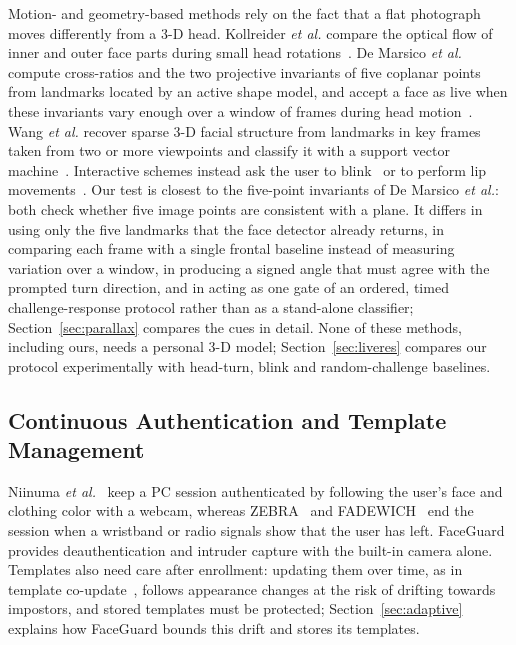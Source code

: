 \documentclass{ieeeaccess}
\begin{document}
Motion- and geometry-based methods rely on the fact that a flat photograph moves differently from a 3-D head. Kollreider \emph{et al.} compare the optical flow of inner and outer face parts during small head rotations~\cite{kollreider2007motion}. De Marsico \emph{et al.} compute cross-ratios and the two projective invariants of five coplanar points from landmarks located by an active shape model, and accept a face as live when these invariants vary enough over a window of frames during head motion~\cite{demarsico2012projective}. Wang \emph{et al.} recover sparse 3-D facial structure from landmarks in key frames taken from two or more viewpoints and classify it with a support vector machine~\cite{wang2013structure}. Interactive schemes instead ask the user to blink~\cite{pan2007eyeblink} or to perform lip movements~\cite{zhou2024lipmotion}. Our test is closest to the five-point invariants of De Marsico \emph{et al.}: both check whether five image points are consistent with a plane. It differs in using only the five landmarks that the face detector already returns, in comparing each frame with a single frontal baseline instead of measuring variation over a window, in producing a signed angle that must agree with the prompted turn direction, and in acting as one gate of an ordered, timed challenge-response protocol rather than as a stand-alone classifier; Section~\ref{sec:parallax} compares the cues in detail. None of these methods, including ours, needs a personal 3-D model; Section~\ref{sec:liveres} compares our protocol experimentally with head-turn, blink and random-challenge baselines.

\subsection{Continuous Authentication and Template Management}
Niinuma \emph{et al.}~\cite{niinuma2010soft} keep a PC session authenticated by following the user's face and clothing color with a webcam, whereas ZEBRA~\cite{mare2014zebra} and FADEWICH~\cite{conti2017fadewich} end the session when a wristband or radio signals show that the user has left. FaceGuard provides deauthentication and intruder capture with the built-in camera alone. Templates also need care after enrollment: updating them over time, as in template co-update~\cite{rattani2008coupdate}, follows appearance changes at the risk of drifting towards impostors, and stored templates must be protected; Section~\ref{sec:adaptive} explains how FaceGuard bounds this drift and stores its templates.
\end{document}
